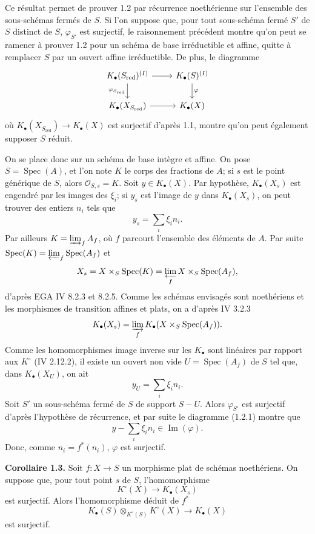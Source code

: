 \documentclass[11pt]{article}
\newcommand{\Spec}{\operatorname{Spec}}
\begin{document}
Ce résultat permet de prouver 1.2 par récurrence noethérienne sur l'ensemble des sous-schémas fermés de $S$. Si l'on suppose que, pour tout sous-schéma fermé $S'$ de $S$ distinct de $S$, $\varphi_{S'}$ est surjectif, le raisonnement précédent montre qu'on peut se ramener à prouver 1.2 pour un schéma de base irréductible et affine, quitte à remplacer $S$ par un ouvert affine irréductible. De plus, le diagramme
\[
\begin{tikzcd}
K_\bullet(S_{\mathrm{red}})^{(I)} \arrow[r] \arrow[d,"\varphi_{S_{\mathrm{red}}}"'] & K_\bullet(S)^{(I)} \arrow[d,"\varphi"]\\
K_\bullet(X_{S_{\mathrm{red}}}) \arrow[r] & K_\bullet(X)
\end{tikzcd}
\]
où $K_\bullet(X_{S_{\mathrm{red}}})\to K_\bullet(X)$ est surjectif d'après 1.1, montre qu'on peut également supposer $S$ réduit.

On se place donc sur un schéma de base intègre et affine. On pose $S=\Spec(A)$, et l'on note $K$ le corps des fractions de $A$; si $s$ est le point générique de $S$, alors $\mathcal O_{S,s}=K$. Soit $y\in K_\bullet(X)$. Par hypothèse, $K_\bullet(X_s)$ est engendré par les images des $\xi_i$; si $y_s$ est l'image de $y$ dans $K_\bullet(X_s)$, on peut trouver des entiers $n_i$ tels que
\[
y_s=\sum_i\xi_i n_i.
\]
Par ailleurs $K=\varinjlim_f A_f$, où $f$ parcourt l'ensemble des éléments de $A$. Par suite $\Spec(K)=\varprojlim_f\Spec(A_f)$ et
\[
X_s=X\times_S\Spec(K)=\varprojlim_f X\times_S\Spec(A_f),
\]
d'après EGA IV 8.2.3 et 8.2.5. Comme les schémas envisagés sont noethériens et les morphismes de transition affines et plats, on a d'après IV 3.2.3
\[
K_\bullet(X_s)=\varinjlim_f K_\bullet(X\times_S\Spec(A_f)).
\]
Comme les homomorphismes image inverse sur les $K_\bullet$ sont linéaires par rapport aux $K^\circ$ (IV 2.12.2), il existe un ouvert non vide $U=\Spec(A_f)$ de $S$ tel que, dans $K_\bullet(X_U)$, on ait
\[
y_U=\sum_i\xi_i n_i.
\]
Soit $S'$ un sous-schéma fermé de $S$ de support $S-U$. Alors $\varphi_{S'}$ est surjectif d'après l'hypothèse de récurrence, et par suite le diagramme (1.2.1) montre que
\[
y-\sum_i\xi_i n_i\in \operatorname{Im}(\varphi).
\]
Donc, comme $n_i=f^*(n_i)$, $\varphi$ est surjectif.

\textbf{Corollaire 1.3.} Soit $f:X\to S$ un morphisme plat de schémas noethériens. On suppose que, pour tout point $s$ de $S$, l'homomorphisme
\[
K^\circ(X)\longrightarrow K_\bullet(X_s)
\]
est surjectif. Alors l'homomorphisme déduit de $f^*$
\[
K_\bullet(S)\otimes_{K^\circ(S)}K^\circ(X)\longrightarrow K_\bullet(X)
\]
est surjectif.
\end{document}
